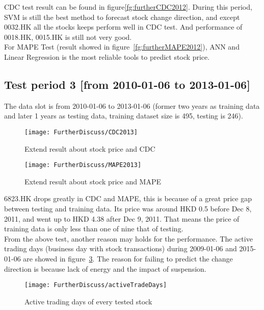 CDC test result can be found in figure\ref{fg:furtherCDC2012}. During this period, SVM is still the best method to forecast stock change direction, and except 0032.HK all the stocks keeps perform well in CDC test. And performance of 0018.HK, 0015.HK is still not very good. \\


For MAPE Test (result showed in figure~\ref{fg:furtherMAPE2012}), ANN and Linear Regression is the most reliable tools to predict stock price.

\subsection{Test period 3 [from 2010-01-06 to 2013-01-06]}
The data slot is from 2010-01-06 to 2013-01-06 (former two years as training data and later 1 years as testing data, training dataset size is 495, testing is 246).
\clearpage

\begin{figure}[h]
	\centering
	\texttt{[image: FurtherDiscuss/CDC2013]}
	\caption{Extend result about stock price and CDC}
	\label{fg:furtherCDC2013}
\end{figure}


\begin{figure}[h]
	\centering
	\texttt{[image: FurtherDiscuss/MAPE2013]}
	\caption{Extend result about stock price and MAPE}
	\label{fg:furtherMAPE2013}
\end{figure}

6823.HK drops greatly in CDC and MAPE, this is because of a great price gap between testing and training data. Its price was around HKD 0.5 before Dec 8, 2011, and went up to HKD 4.38 after Dec 9, 2011. That means the price of training data is only less than one of nine that of testing.\\


From the above test, another reason may holds for the performance. The active trading days (business day with stock transactions) during 2009-01-06 and 2015-01-06 are showed in figure~\ref{fg:activeTradingDays}. The reason for failing to predict the change direction is because lack of energy and the impact of suspension.


\begin{figure}[h]
	\centering
	\texttt{[image: FurtherDiscuss/activeTradeDays]}
	\caption{Active trading days of every tested stock}
	\label{fg:activeTradingDays}
\end{figure}

